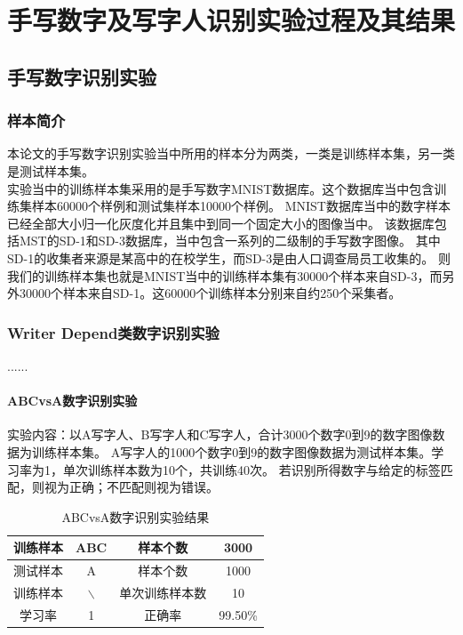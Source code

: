 \section{手写数字及写字人识别实验过程及其结果}

\subsection{手写数字识别实验}

\subsubsection{样本简介}
本论文的手写数字识别实验当中所用的样本分为两类，一类是训练样本集，另一类是测试样本集。\\
\hspace*{\parindent}实验当中的训练样本集采用的是手写数字MNIST数据库。这个数据库当中包含训练集样本60000个样例和测试集样本10000个样例。
MNIST数据库当中的数字样本已经全部大小归一化灰度化并且集中到同一个固定大小的图像当中。
该数据库包括MST的SD-1和SD-3数据库，当中包含一系列的二级制的手写数字图像。
其中SD-1的收集者来源是某高中的在校学生，而SD-3是由人口调查局员工收集的。
则我们的训练样本集也就是MNIST当中的训练样本集有30000个样本来自SD-3，而另外30000个样本来自SD-1。这60000个训练样本分别来自约250个采集者。

\subsubsection{Writer Depend类数字识别实验}
......

\paragraph{ABCvsA数字识别实验}
\hspace*{\parindent}实验内容：以A写字人、B写字人和C写字人，合计3000个数字0到9的数字图像数据为训练样本集。
A写字人的1000个数字0到9的数字图像数据为测试样本集。学习率为1，单次训练样本数为10个，共训练40次。
若识别所得数字与给定的标签匹配，则视为正确；不匹配则视为错误。
\begin{table}[!htbp]
    \centering
    \caption{ABCvsA数字识别实验结果}
    \begin{tabular}[\textwidth]{c|c|c|c}
        \hline
        训练样本 & ABC & 样本个数 & 3000 \\
        \hline
        测试样本 & A & 样本个数 & 1000 \\
        \hline
        训练样本 & $\backslash$ & 单次训练样本数 & 10 \\
        \hline
        学习率 & 1 & 正确率 & 99.50\% \\
        \hline
    \end{tabular}
\end{table}

